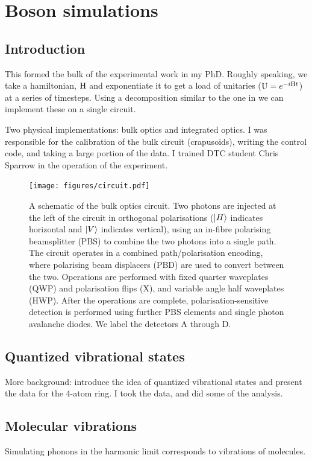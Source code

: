 \chapter{Boson simulations}
\label{ch:Simulations}

\section{Introduction}
\label{sec:SimIntro}
This formed the bulk of the experimental work in my PhD. Roughly speaking, we
take a hamiltonian, \(\mathrm{H}\) and exponentiate it to get a load of unitaries
(\(\mathrm{U}=e^{-i\mathrm{H}t}\)) at a series of timesteps. Using a decomposition
similar to the one in \cite{reck} we can implement these on a single
circuit.

Two physical implementations: bulk optics and integrated optics. I was
responsible for the calibration of the bulk circuit (crapusoids), writing the
control code, and taking a large portion of the data. I trained DTC student
Chris Sparrow in the operation of the experiment.

\begin{figure}
  \centering
  \texttt{[image: figures/circuit.pdf]}
  \caption[A schematic of the bulk optics circuit used for simulations.]
  {A schematic of the bulk optics circuit. Two photons are injected at
  the left of the circuit in orthogonal polarisations (\(\left|H\right\rangle\) indicates
  horizontal and \(\left|V\right\rangle\) indicates vertical), using an in-fibre polarising
  beamsplitter (PBS) to combine the two photons into a single path. The circuit
  operates in a combined path/polarisation encoding, where polarising beam
  displacers (PBD) are used to convert between the two. Operations are performed
  with fixed quarter waveplates (QWP) and polarisation flips (X), and variable
  angle half waveplates (HWP). After the operations are complete,
  polarisation-sensitive detection is performed using further PBS elements and
  single photon avalanche diodes. We label the detectors A through D.}
  \label{fig:circuit}
\end{figure}

\section{Quantized vibrational states}
\label{sec:Phonons}
More background: introduce the idea of quantized vibrational states and present
the data for the 4-atom ring. I took the data, and did some of the analysis.

\section{Molecular vibrations}
\label{sec:Molecules}
Simulating phonons in the harmonic limit corresponds to vibrations of molecules.

